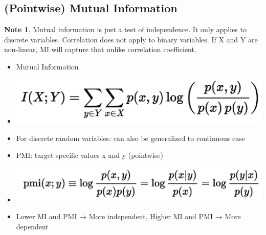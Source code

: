 \documentclass[11pt]{article}
\theoremstyle{definition}
\newtheorem{note}{Note}
\begin{document}
\subsection{(Pointwise) Mutual Information}
\begin{note}
  Mutual information is just a test of independence. It only applies to discrete variables. Correlation does not apply to binary variables. If X and Y are non-linear, MI will capture that unlike correlation coefficient.
\end{note}
\begin{itemize}
  \item Mutual Information
  \item \includegraphics[width=\textwidth/2]{16.png}
  \item For discrete random
  variables: can also
  be generalized to
  continuous case
  \item PMI: target specific values x and y (pointwise)
  \item \includegraphics[width=\textwidth/2]{17.png}
  \item Lower MI and PMI → More independent, Higher MI and PMI → More dependent
\end{itemize}
\end{document}
